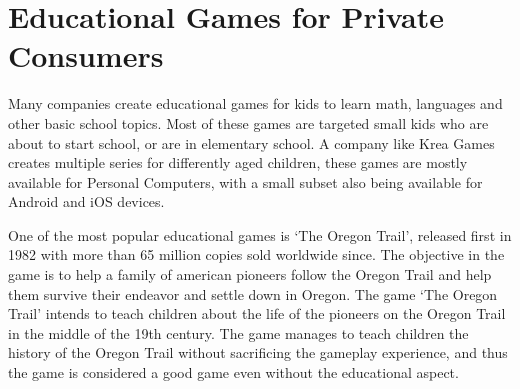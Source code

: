 \section{Educational Games for Private Consumers}
\label{sec:privateconsumers}
Many companies create educational games for kids to learn math, languages and other basic school topics. Most of these games are targeted small kids who are about to start school, or are in elementary school. A company like Krea Games\cite{kreagames} creates multiple series for differently aged children, these games are mostly available for Personal Computers, with a small subset also being available for Android and iOS devices.

One of the most popular educational games is `The Oregon Trail', released first in 1982 with more than 65 million copies sold worldwide since\cite{oregontrail}. The objective in the game is to help a family of american pioneers follow the Oregon Trail and help them survive their endeavor and settle down in Oregon.
The game `The Oregon Trail' intends to teach children about the life of the pioneers on the Oregon Trail in the middle of the 19th century. The game manages to teach children the history of the Oregon Trail without sacrificing the gameplay experience, and thus the game is considered a good game even without the educational aspect.